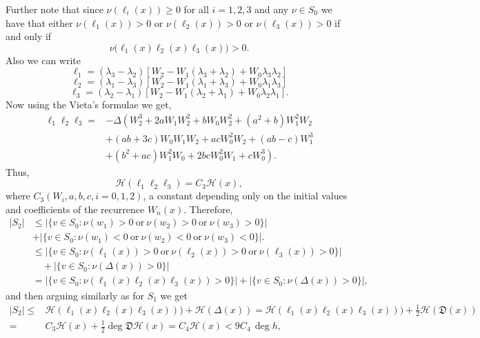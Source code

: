 \documentclass[12pt]{amsart}
\begin{document}
Further note that since $\nu(\ell_i(x)) \geq 0$ for all $i=1,2,3$ and any $\nu \in S_{0}$ we have that either 
$\nu(\ell_1(x)) > 0$ or $\nu(\ell_2(x)) > 0$ or $\nu(\ell_3(x)) > 0$ if and only if
\[
\nu\big(\ell_1(x)\ell_2(x)\ell_3(x)\big) > 0.
\]
Also we can write
\[
\ell_1=(\lambda_3-\lambda_2)[W_2-W_1(\lambda_3+\lambda_2)+W_0\lambda_3\lambda_2]
\]
\[
\ell_2=(\lambda_1-\lambda_3)[W_2-W_1(\lambda_1+\lambda_3)+W_0\lambda_1\lambda_3]
\]
\[
\ell_3=(\lambda_2-\lambda_1)[W_2-W_1(\lambda_2+\lambda_1)+W_0\lambda_2\lambda_1].
\] Now using the Vieta's formulae we get,
\begin{align*}
    \ell_1\ell_2\ell_3=& -\Delta\left( W_2^3+2a W_1W_2^2+bW_0W_2^2+(a^2+b)W_1^2W_2\right.\\
    &\left. +(ab+3c)W_0W_1W_2 +acW_0^2W_2+(ab-c) W_1^3 \right.\\
    & \left. +(b^2+ac)W_1^2W_0+ 2bcW_0^2W_1+cW_0^3\right).
\end{align*}
Thus, 
\[
\mathcal{H}(\ell_1\ell_2\ell_3)=C_3\mathcal{H}(x),
\]
where $C_3(W_i, a,b,c, i=0,1,2)$, a constant depending only on the initial values and coefficients of the recurrence $W_n(x)$.
Therefore,
\begin{align*}
   |S_{2}|& \leq |\{ v \in S_{0} : \nu(w_{1}) > 0 \ \text{or}\ \nu(w_{2}) > 0 \ \text{or}\ \nu(w_{3}) > 0 \}|\\
   &+ |\{ v \in S_{0} : \nu(w_{1}) < 0 \ \text{or}\ \nu(w_{2}) < 0 \ \text{or}\ \nu(w_{3}) < 0\}|.\\
   &\leq |\{ v \in S_{0} : \nu(\ell_1(x)) > 0 \ \text{or}\ 
                     \nu(\ell_2(x)) > 0 \ \text{or}\ 
                     \nu(\ell_3(x)) > 0 \}|\\
   &\quad + |\{ v \in S_{0} : \nu(\Delta(x)) > 0 \}|\\
   & = |\{ v \in S_{0} : \nu(\ell_1(x)\ell_2(x)\ell_3(x)) > 0 \}|+ |\{ v \in S_{0} : \nu(\Delta(x)) > 0 \}|,
\end{align*} and then arguing similarly as for $S_{1}$ we get
\begin{align*}
    |S_{2}| \leq& \mathcal{H}(\ell_1(x)\ell_2(x)\ell_3(x))) 
   + \mathcal{H}(\Delta(x))=\mathcal{H}(\ell_1(x)\ell_2(x)\ell_3(x))) 
   + \frac{1}{2}\mathcal{H}(\mathfrak{D}(x))\\
   =& C_3\mathcal{H}(x)+\frac{1}{2}\deg \mathfrak{D} \mathcal{H}(x)=C_4\mathcal{H}(x) < 9C_4\, \deg h,
\end{align*}
\end{document}
